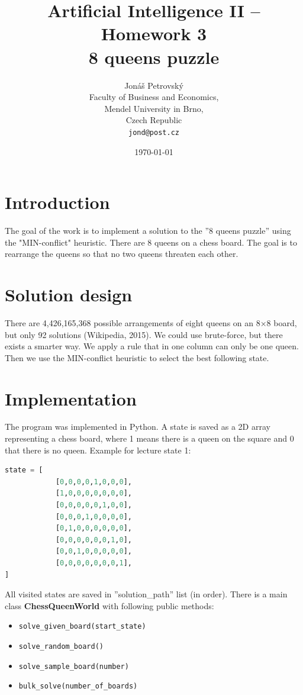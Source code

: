 \documentclass[a4paper]{article}
\begin{document}
\title{\vspace{-1.0cm}Artificial Intelligence II -- Homework 3 \\ \textbf{8 queens puzzle}}
\author{Jonáš Petrovský\\
        Faculty of Business and Economics,\\
		Mendel University in Brno,\\
		Czech Republic \\
		\texttt{jond@post.cz}}
\date{\today}
\maketitle

\section{Introduction}
The goal of the work is to implement a solution to the ''8 queens puzzle'' using the "MIN-conflict" heuristic. There are 8 queens on a chess board. The goal is to rearrange the queens so that no two queens threaten each other.

\section{Solution design}
There are 4,426,165,368 possible arrangements of eight queens on an 8×8 board, but only 92 solutions (Wikipedia, 2015). We could use brute-force, but there exists a smarter way. We apply a rule that in one column can only be one queen. Then we use the MIN-conflict heuristic to select the best following state.

\section{Implementation}
The program was implemented in Python. A state is saved as a 2D array representing a chess board, where 1 means there is a queen on the square and 0 that there is no queen. Example for lecture state 1:
\begin{lstlisting}[language=python]
state = [
            [0,0,0,0,1,0,0,0],
            [1,0,0,0,0,0,0,0],
            [0,0,0,0,0,1,0,0],
            [0,0,0,1,0,0,0,0],
            [0,1,0,0,0,0,0,0],
            [0,0,0,0,0,0,1,0],
            [0,0,1,0,0,0,0,0],
            [0,0,0,0,0,0,0,1],
]
\end{lstlisting}
All visited states are saved in ''solution\_path'' list (in order). There is a main class \textbf{ChessQueenWorld} with following public methods: 
\begin{itemize}
\item \verb|solve_given_board(start_state)|
\item \verb|solve_random_board()|
\item \verb|solve_sample_board(number)|
\item \verb|bulk_solve(number_of_boards)|
\end{itemize}
\end{document}
